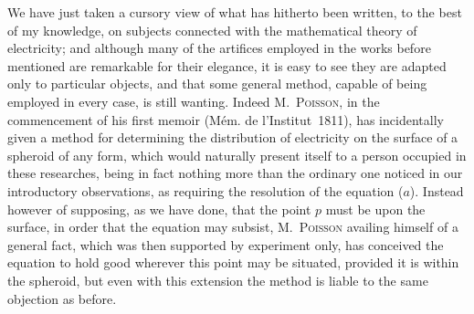 \documentclass[12pt,notitlepage]{amsart}
\let\Person\textsc
\begin{document}
We have just taken a cursory view of what has hitherto been written,
to the best of my knowledge, on subjects connected with the mathematical
theory of electricity; and although many of the artifices employed in the works
before mentioned are remarkable for their elegance, it is easy to see they are
adapted only to particular objects, and that some general method, capable of
being employed in every case, is still wanting. Indeed M.~\Person{Poisson},
in the commencement of his first memoir
(M\'em. de l'Institut~1811), has incidentally
given a method for determining the distribution of electricity on the surface
of a spheroid of any form, which would naturally present itself to a person
occupied in these researches, being in fact nothing more than the ordinary
one noticed in our introductory observations, as requiring the resolution of
the equation ($a$). Instead however of supposing, as we have done, that the
point $p$ must be upon the surface, in order that the equation may subsist,
M.~\Person{Poisson} availing himself of a general fact,
which was then supported by
experiment only, has conceived the equation to hold good wherever this point
may be situated, provided it is within the spheroid, but even with this 
extension the method is liable to the same objection as before.
\end{document}
